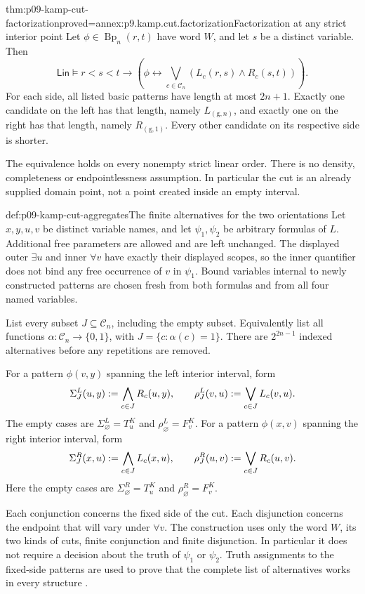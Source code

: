 \begin{hblemma}{thm:p09-kamp-cut-factorization}{proved=annex:p9.kamp.cut.factorization}{Factorization at any strict interior point}
Let \(\phi\in\operatorname{Bp}_n(r,t)\) have word \(W\), and
let \(s\) be a distinct variable. Then
\[
 \mathsf{Lin}\models r<s<t\longrightarrow
 \left(\phi\longleftrightarrow
       \bigvee_{c\in\mathcal C_n}(L_c(r,s)\land R_c(s,t))\right).
\]
For each side, all listed basic patterns have length at most
\(2n+1\). Exactly one candidate on the left has that length,
namely \(L_{(\mathrm g,n)}\), and exactly one on the right has
that length, namely \(R_{(\mathrm g,1)}\). Every other candidate
on its respective side is shorter.

The equivalence holds on every nonempty strict linear order. There is
no density, completeness or endpointlessness assumption. In particular
the cut is an already supplied domain point, not a point created inside
an empty interval.
\end{hblemma}

\begin{hbmethod}{def:p09-kamp-cut-aggregates}{The finite alternatives for the two orientations}
Let \(x,y,u,v\) be distinct variable names, and let \(\psi_1,\psi_2\)
be arbitrary formulas of \(L\). Additional free parameters are allowed
and are left unchanged. The displayed outer \(\exists u\) and
inner \(\forall v\) have exactly their displayed scopes, so the
inner quantifier does not bind any free occurrence of \(v\) in
\(\psi_1\). Bound variables internal to newly constructed patterns
are chosen fresh from both formulas and from all four named variables.

List every subset \(J\subseteq\mathcal C_n\), including the empty
subset. Equivalently list all functions
\(\alpha:\mathcal C_n\to\{0,1\}\), with
\(J=\{c:\alpha(c)=1\}\). There are \(2^{2n-1}\) indexed
alternatives before any repetitions are removed.

For a pattern \(\phi(v,y)\) spanning the left interior interval,
form
\[
 \Sigma_J^L(u,y)\mathrel{:=}\bigwedge_{c\in J}R_c(u,y),\qquad
 \rho_J^L(v,u)\mathrel{:=}\bigvee_{c\in J}L_c(v,u).
\]
The empty cases are \(\Sigma_\varnothing^L=T^K_u\) and
\(\rho_\varnothing^L=F^K_v\).
For a pattern \(\phi(x,v)\) spanning the right interior interval,
form
\[
 \Sigma_J^R(x,u)\mathrel{:=}\bigwedge_{c\in J}L_c(x,u),\qquad
 \rho_J^R(u,v)\mathrel{:=}\bigvee_{c\in J}R_c(u,v).
\]
Here the empty cases are \(\Sigma_\varnothing^R=T^K_u\) and
\(\rho_\varnothing^R=F^K_v\).

Each conjunction concerns the fixed side of the cut. Each disjunction
concerns the endpoint that will vary under \(\forall v\).
The construction uses only the word \(W\), its two kinds of cuts,
finite conjunction and finite disjunction. In particular it does not
require a decision about the truth of \(\psi_1\) or \(\psi_2\).
Truth assignments to the fixed-side patterns are used to prove that the
complete list of alternatives works in every structure
\cite[ch.~III, pp.~81--83]{Kamp1968}.
\end{hbmethod}

